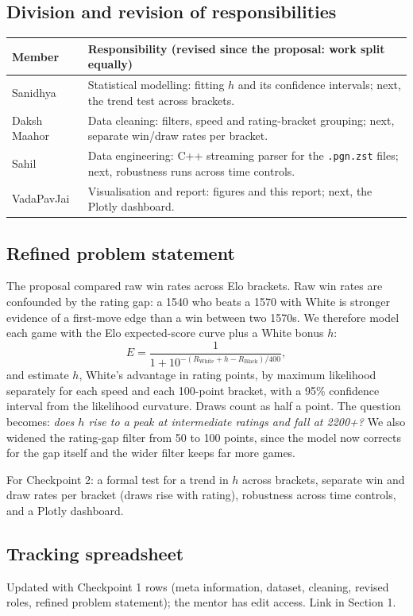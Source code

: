 \documentclass[11pt,a4paper]{article}
\begin{document}
\subsection*{Division and revision of responsibilities}
\begin{tabularx}{\linewidth}{@{}lX@{}}
\toprule
Member & Responsibility (revised since the proposal: work split equally) \\
\midrule
Sanidhya & Statistical modelling: fitting $h$ and its confidence intervals; next, the trend test across brackets. \\
Daksh Maahor & Data cleaning: filters, speed and rating-bracket grouping; next, separate win/draw rates per bracket. \\
Sahil & Data engineering: C++ streaming parser for the \texttt{.pgn.zst} files; next, robustness runs across time controls. \\
VadaPavJai & Visualisation and report: figures and this report; next, the Plotly dashboard. \\
\bottomrule
\end{tabularx}

\subsection*{Refined problem statement}
The proposal compared raw win rates across Elo brackets. Raw win rates are confounded by the rating
gap: a 1540 who beats a 1570 with White is stronger evidence of a first-move edge than a win between
two 1570s. We therefore model each game with the Elo expected-score curve plus a White bonus $h$:
\[
E = \frac{1}{1 + 10^{-(R_\text{White} + h - R_\text{Black})/400}},
\]
and estimate $h$, White's advantage in rating points, by maximum likelihood separately for each speed
and each 100-point bracket, with a 95\% confidence interval from the likelihood curvature. Draws count
as half a point. The question becomes: \emph{does $h$ rise to a peak at intermediate ratings and
fall at 2200+?} We also widened the rating-gap filter from 50 to 100 points, since the model now
corrects for the gap itself and the wider filter keeps far more games.

For Checkpoint 2: a formal test for a trend in $h$ across brackets, separate win and draw rates per
bracket (draws rise with rating), robustness across time controls, and a Plotly dashboard.

\subsection*{Tracking spreadsheet}
Updated with Checkpoint 1 rows (meta information, dataset, cleaning, revised roles, refined problem
statement); the mentor has edit access. Link in Section 1.
\end{document}
